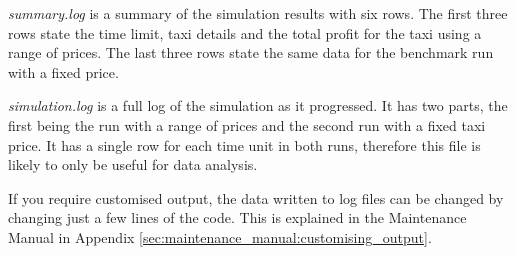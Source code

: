 \textit{summary.log} is a summary of the simulation results with six rows. The
first three rows state the time limit, taxi details and the total profit for
the taxi using a range of prices. The last three rows state the same data for
the benchmark run with a fixed price.

\textit{simulation.log} is a full log of the simulation as it progressed. It
has two parts, the first being the run with a range of prices and the second
run with a fixed taxi price. It has a single row for each time unit in both
runs, therefore this file is likely to only be useful for data analysis.


If you require customised output, the data written to log files can be changed
by changing just a few lines of the code. This is explained in the Maintenance
Manual in Appendix \ref{sec:maintenance_manual:customising_output}.
